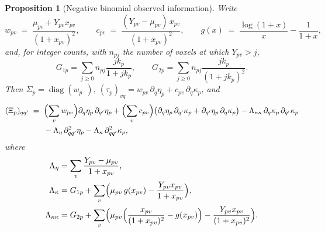 \documentclass[11pt,a4paper]{article}
\theoremstyle{plain}
\newtheorem{proposition}{Proposition}
\theoremstyle{definition}
\newcommand{\diag}{\operatorname{diag}}
\begin{document}
\begin{proposition}[Negative binomial observed information]\label{prop:nb}
Write
\begin{equation}\label{eq:nb-sigma}
  w_{pv} \;=\; \frac{\mu_{pv} + Y_{pv}x_{pv}}{(1+x_{pv})^{2}}, \qquad
  c_{pv} \;=\; \frac{(Y_{pv} - \mu_{pv})\,x_{pv}}{(1+x_{pv})^{2}}, \qquad
  g(x) \;=\; \frac{\log(1+x)}{x} - \frac{1}{1+x},
\end{equation}
and, for integer counts, with $n_{pj}$ the number of voxels at which $Y_{pv} > j$,
\begin{equation}\label{eq:nb-count-sums}
  G_{1p} = \sum_{j\ge 0} n_{pj}\frac{jk_p}{1+jk_p}, \qquad
  G_{2p} = \sum_{j\ge 0} n_{pj}\frac{jk_p}{(1+jk_p)^2}.
\end{equation}
Then $\Sigma_p = \diag(w_{p\cdot})$, $(\tau_p)_{vq} = w_{pv}\,\partial_q\eta_p + c_{pv}\,\partial_q\kappa_p$,
and
\begin{equation}\label{eq:nb-gg}
\begin{split}
  (\Xi_p)_{qq'} \;=\;{}& \Bigl(\sum_v w_{pv}\Bigr)\partial_q\eta_p\,\partial_{q'}\eta_p
    + \Bigl(\sum_v c_{pv}\Bigr)\bigl(\partial_q\eta_p\,\partial_{q'}\kappa_p
      + \partial_{q'}\eta_p\,\partial_q\kappa_p\bigr)
    - \Lambda_{\kappa\kappa}\,\partial_q\kappa_p\,\partial_{q'}\kappa_p\\
    &{}- \Lambda_\eta\,\partial^2_{qq'}\eta_p - \Lambda_\kappa\,\partial^2_{qq'}\kappa_p ,
\end{split}
\end{equation}
where
\begin{align}
  \Lambda_\eta &= \sum_v \frac{Y_{pv}-\mu_{pv}}{1+x_{pv}}, \notag\\
  \Lambda_\kappa &= G_{1p} + \sum_v \Bigl(\mu_{pv}\,g(x_{pv})
     - \frac{Y_{pv}x_{pv}}{1+x_{pv}}\Bigr), \label{eq:nb-second}\\
  \Lambda_{\kappa\kappa} &= G_{2p} + \sum_v \Bigl(\mu_{pv}\Bigl(\frac{x_{pv}}{(1+x_{pv})^2}
     - g(x_{pv})\Bigr) - \frac{Y_{pv}x_{pv}}{(1+x_{pv})^2}\Bigr). \notag
\end{align}
\end{proposition}
\end{document}

